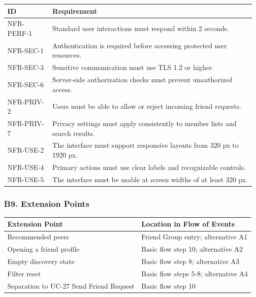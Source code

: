 \documentclass[12pt]{article}
\renewcommand{\baselinestretch}{1.5}
\begin{document}
\begingroup
\small
\renewcommand{\baselinestretch}{1.0}\selectfont
\renewcommand{\arraystretch}{1.15}
\setlength{\tabcolsep}{6pt}
\begin{longtable}{|>{\raggedright\arraybackslash}p{}|>{\raggedright\arraybackslash}p{}|}
\hline
\textbf{ID} & \textbf{Requirement} \\ \hline
\endhead
NFR-PERF-1 & Standard user interactions must respond within 2 seconds. \\ \hline
NFR-SEC-1 & Authentication is required before accessing protected user resources. \\ \hline
NFR-SEC-3 & Sensitive communication must use TLS 1.2 or higher. \\ \hline
NFR-SEC-6 & Server-side authorization checks must prevent unauthorized access. \\ \hline
NFR-PRIV-2 & Users must be able to allow or reject incoming friend requests. \\ \hline
NFR-PRIV-7 & Privacy settings must apply consistently to member lists and search results. \\ \hline
NFR-USE-2 & The interface must support responsive layouts from 320 px to 1920 px. \\ \hline
NFR-USE-4 & Primary actions must use clear labels and recognizable controls. \\ \hline
NFR-USE-5 & The interface must be usable at screen widths of at least 320 px. \\ \hline
\end{longtable}
\endgroup
\par\medskip

\hypertarget{sec:b9-extension-points}{}
\subsubsection*{B9. Extension Points}
\par\medskip

\begingroup
\small
\renewcommand{\baselinestretch}{1.0}\selectfont
\renewcommand{\arraystretch}{1.15}
\setlength{\tabcolsep}{6pt}
\begin{longtable}{|>{\raggedright\arraybackslash}p{}|>{\raggedright\arraybackslash}p{}|}
\hline
\textbf{Extension Point} & \textbf{Location in Flow of Events} \\ \hline
\endhead
Recommended peers & Friend Group entry; alternative A1 \\ \hline
Opening a friend profile & Basic flow step 10; alternative A2 \\ \hline
Empty discovery state & Basic flow step 8; alternative A3 \\ \hline
Filter reset & Basic flow steps 5-8; alternative A4 \\ \hline
Separation to UC-27 Send Friend Request & Basic flow step 10 \\ \hline
\end{longtable}
\endgroup
\par\medskip
\end{document}
